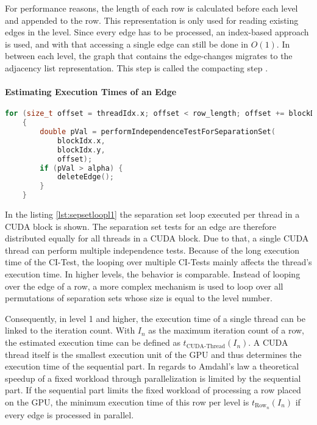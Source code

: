 For performance reasons, the length of each row is calculated before each level and appended to the row. This representation is only used for reading existing edges in the level. Since every edge has to be processed, an index-based approach is used, and with that accessing a single edge can still be done in $O(1)$.
In between each level, the graph that contains the edge-changes migrates to the adjacency list representation. This step is called the compacting step \cite{zarebavaniCuPCCUDAbasedParallel2018}.

\paragraph{Estimating Execution Times of an Edge}

\begin{lstlisting}[language=C++, caption=Basic separation set loop in level 1, label=lst:sepsetloopl1]
    for (size_t offset = threadIdx.x; offset < row_length; offset += blockDim.x)
    {
        double pVal = performIndependenceTestForSeparationSet(
            blockIdx.x,
            blockIdx.y,
            offset);
        if (pVal > alpha) {
            deleteEdge();
        }
    }
\end{lstlisting}

In the listing \ref{lst:sepsetloopl1} the separation set loop executed per thread in a CUDA block is shown. The separation set tests for an edge are therefore distributed equally for all threads in a CUDA block. Due to that, a single CUDA thread can perform multiple independence tests. Because of the long execution time of the CI-Test, the looping over multiple CI-Tests mainly affects the thread's execution time. In higher levels, the behavior is comparable. Instead of looping over the edge of a row, a more complex mechanism is used to loop over all permutations of separation sets whose size is equal to the level number.

Consequently, in level 1 and higher, the execution time of a single thread can be linked to the iteration count. With $I_n$ as the maximum iteration count of a row, the estimated execution time can be defined as $t_{\text{CUDA-Thread}}(I_n)$. A CUDA thread itself is the smallest execution unit of the GPU and thus determines the execution time of the sequential part. In regards to Amdahl's law \cite{amdahlValiditySingleProcessor1967} a theoretical speedup of a fixed workload through parallelization is limited by the sequential part. If the sequential part limits the fixed workload of processing a row placed on the GPU, the minimum execution time of this row per level is $t_{\text{Row}_n}(I_n)$ if every edge is processed in parallel.

